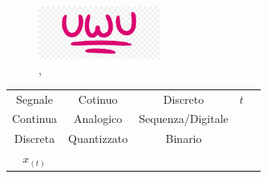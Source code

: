 \begin{itemize}
{\begin{itemize}
                    \end{itemize}
                    \begin{figure}[h]
                        \centering
                        \includegraphics[width=4cm]{media/uwu.png}
                        \caption{\color{purple}{ampiezza continua}, \color{blue}{ampiezza discreta}}
                        \label{fig:galaxy}
                    \end{figure}
            }
        \end{itemize}
        \begin{table}[h]
            \centering
            \begin{tabular}{c|cccc}
            Segnale   & \multicolumn{1}{c|}{Cotinuo}     & Discreto          & $t$ &  \\ \cline{1-4}
            Continua  & \multicolumn{1}{c|}{Analogico}   & Sequenza/Digitale &       &  \\ \cline{1-3}
            Discreta  & \multicolumn{1}{c|}{Quantizzato} & Binario           &       &  \\
            $x_{(t)}$ &                                  &                   &       & 
            \end{tabular}
        \end{table}
